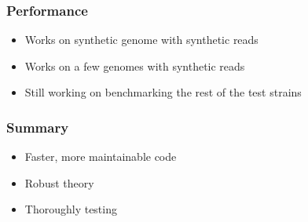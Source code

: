 \documentclass[10pt, compress]{beamer}
\begin{document}
\begin{frame}[fragile]
  \frametitle{Performance}
  \begin{itemize}
    \item Works on synthetic genome with synthetic reads
    \item Works on a few genomes with synthetic reads
    \item Still working on benchmarking the rest of the test strains
    \end{itemize}
\end{frame}

\begin{frame}[fragile]
  \frametitle{Summary}
  \begin{itemize}
    \item Faster, more maintainable code
    \item Robust theory
    \item Thoroughly testing
  \end{itemize}
\end{frame}
\end{document}
